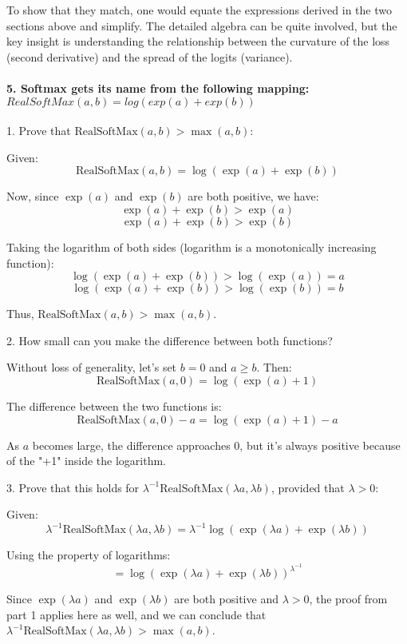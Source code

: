 To show that they match, one would equate the expressions derived in the two sections above and simplify.
The detailed algebra can be quite involved, but the key insight is understanding the relationship between the curvature of the loss (second derivative) and the spread of the logits (variance).


\paragraph{5. Softmax gets its name from the following mapping: \(RealSoftMax(a, b) = log(exp(a) + exp(b))\)}

1. Prove that \( \text{RealSoftMax}(a, b) > \max(a, b) \):

Given:
\[ \text{RealSoftMax}(a, b) = \log(\exp(a) + \exp(b)) \]

Now, since \( \exp(a) \) and \( \exp(b) \) are both positive, we have:
\[ \exp(a) + \exp(b) > \exp(a) \]
\[ \exp(a) + \exp(b) > \exp(b) \]

Taking the logarithm of both sides (logarithm is a monotonically increasing function):
\[ \log(\exp(a) + \exp(b)) > \log(\exp(a)) = a \]
\[ \log(\exp(a) + \exp(b)) > \log(\exp(b)) = b \]

Thus, \( \text{RealSoftMax}(a, b) > \max(a, b) \).

2. How small can you make the difference between both functions?

Without loss of generality, let's set \( b = 0 \) and \( a \geq b \). Then:
\[ \text{RealSoftMax}(a, 0) = \log(\exp(a) + 1) \]

The difference between the two functions is:
\[ \text{RealSoftMax}(a, 0) - a = \log(\exp(a) + 1) - a \]

As \( a \) becomes large, the difference approaches 0, but it's always positive because of the "+1" inside the logarithm.

3. Prove that this holds for \( \lambda^{-1} \text{RealSoftMax}(\lambda a, \lambda b) \), provided that \( \lambda > 0 \):

Given:
\[ \lambda^{-1} \text{RealSoftMax}(\lambda a, \lambda b) = \lambda^{-1} \log(\exp(\lambda a) + \exp(\lambda b)) \]

Using the property of logarithms:
\[ = \log(\exp(\lambda a) + \exp(\lambda b))^{\lambda^{-1}} \]

Since \( \exp(\lambda a) \) and \( \exp(\lambda b) \) are both positive and \( \lambda > 0 \), the proof from part 1 applies here as well, and we can conclude that \( \lambda^{-1} \text{RealSoftMax}(\lambda a, \lambda b) > \max(a, b) \).

